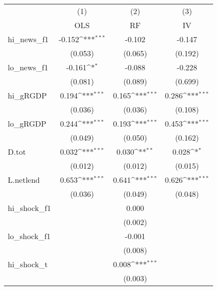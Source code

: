 {
\def\sym#1{\ifmmode^{#1}\else\(^{#1}\)\fi}
\begin{tabular}{l*{3}{c}}
\toprule
            &\multicolumn{1}{c}{(1)}&\multicolumn{1}{c}{(2)}&\multicolumn{1}{c}{(3)}\\
            &\multicolumn{1}{c}{OLS}&\multicolumn{1}{c}{RF}&\multicolumn{1}{c}{IV}\\
\midrule
hi\_news\_f1  &      -0.152\sym{***}&      -0.102         &      -0.147         \\
            &     (0.053)         &     (0.065)         &     (0.192)         \\
\addlinespace
lo\_news\_f1  &      -0.161\sym{*}  &      -0.088         &      -0.228         \\
            &     (0.081)         &     (0.089)         &     (0.699)         \\
\addlinespace
hi\_gRGDP    &       0.194\sym{***}&       0.165\sym{***}&       0.286\sym{***}\\
            &     (0.036)         &     (0.036)         &     (0.108)         \\
\addlinespace
lo\_gRGDP    &       0.244\sym{***}&       0.193\sym{***}&       0.453\sym{***}\\
            &     (0.049)         &     (0.050)         &     (0.162)         \\
\addlinespace
D.tot       &       0.032\sym{***}&       0.030\sym{**} &       0.028\sym{*}  \\
            &     (0.012)         &     (0.012)         &     (0.015)         \\
\addlinespace
L.netlend   &       0.653\sym{***}&       0.641\sym{***}&       0.626\sym{***}\\
            &     (0.036)         &     (0.049)         &     (0.048)         \\
\addlinespace
hi\_shock\_f1 &                     &       0.000         &                     \\
            &                     &     (0.002)         &                     \\
\addlinespace
lo\_shock\_f1 &                     &      -0.001         &                     \\
            &                     &     (0.008)         &                     \\
\addlinespace
hi\_shock\_t  &                     &       0.008\sym{***}&                     \\
            &                     &     (0.003)         &                     \\

\end{tabular}}
